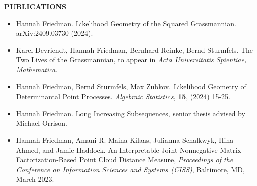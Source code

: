 \documentclass[11pt]{article}
\newcommand{\hdr}[1]{\textcolor{blue(ryb)}{\textbf{#1}}}
\begin{document}
\bigskip

\hdr{PUBLICATIONS}\\
\begin{itemize}
\item Hannah Friedman.
  Likelihood Geometry of the Squared Grassmannian. arXiv:2409.03730 (2024).
  \item Karel Devriendt, Hannah Friedman, Bernhard Reinke, Bernd Sturmfels.
    The Two Lives of the Grassmannian, to appear in \textit{Acta Universitatis Spientiae, Mathematica}. 
\item Hannah Friedman, Bernd Sturmfels, Max Zubkov.
  Likelihood Geometry of Determinantal Point Processes.
  \emph{Algebraic Statistics}, \textbf{15}, (2024) 15-25.
\item Hannah Friedman. Long Increasing Subsequences, senior thesis advised by Michael Orrison. 
\item Hannah Friedman, Amani R. Maina-Kilaas, Julianna Schalkwyk, Hina Ahmed, and Jamie Haddock. 
  An Interpretable Joint Nonnegative Matrix Factorization-Based Point Cloud Distance Measure, \emph{Proceedings of the Conference on Information Sciences and Systems (CISS)}, Baltimore, MD, March 2023.
\end{itemize}

\bigskip
\end{document}
